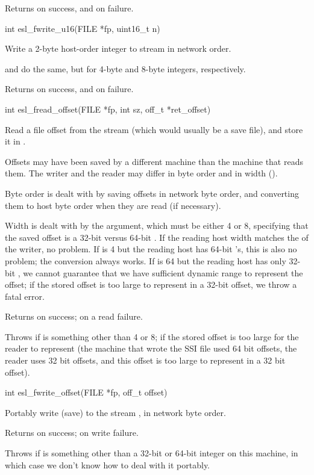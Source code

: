 \begin{sreapi}
Returns  on success, and  on  failure.


\hypertarget{func:esl_fwrite_u16()}
{\item[int esl\_fwrite\_u16(FILE *fp, uint16\_t n)]}

Write a 2-byte host-order integer  to stream 
in network order.

 and  do the same, but
for 4-byte and 8-byte integers, respectively.

Returns  on success, and  on  failure.


\hypertarget{func:esl_fread_offset()}
{\item[int esl\_fread\_offset(FILE *fp, int sz, off\_t *ret\_offset)]}

Read a file offset from the stream  (which would usually
be a save file), and store it in .

Offsets may have been saved by a different machine
than the machine that reads them. The writer and the reader
may differ in byte order and in width (). 

Byte order is dealt with by saving offsets in 
network byte order, and converting them to host byte order
when they are read (if necessary). 

Width is dealt with by the  argument, which must be
either 4 or 8, specifying that the saved offset is a
32-bit versus 64-bit . If the reading host
 width matches the  of the writer, no
problem. If  is 4 but the reading host has 64-bit
's, this is also no problem; the conversion
always works. If  is 64 but the reading host has
only 32-bit , we cannot guarantee that we have
sufficient dynamic range to represent the offset; if
the stored offset is too large to represent in a 32-bit
offset, we throw a fatal  error.

Returns  on success;  on a read failure.

Throws  if  is something other than 4 or 8;
 if the stored offset is too large for
the reader to represent (the machine that wrote the
SSI file used 64 bit offsets, the reader uses 32
bit offsets, and this offset is too large to represent
in a 32 bit offset).


\hypertarget{func:esl_fwrite_offset()}
{\item[int esl\_fwrite\_offset(FILE *fp, off\_t offset)]}

Portably write (save)  to the stream , in network
byte order. 

Returns  on success;  on write failure.

Throws  if  is something other than a 32-bit or
64-bit integer on this machine, in which case we don't know
how to deal with it portably.


\end{sreapi}

